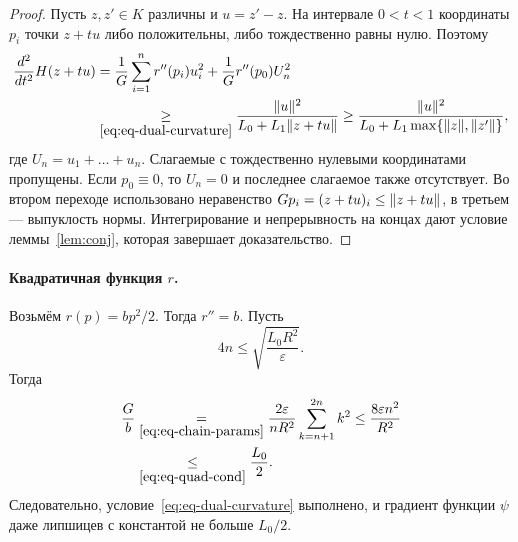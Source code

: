 \begin{proof}
Пусть $z,z'\in K$ различны и $u=z'-z$. На интервале $0<t<1$ координаты $p_i$ точки $z+tu$ либо положительны, либо тождественно равны нулю. Поэтому
\begin{align*}
 \frac{d^2}{dt^2}H(z+tu)
 &=\frac1G\sum_{i=1}^nr''(p_i)u_i^2+\frac1Gr''(p_0)U_n^2\\
 &\mathrel{\underset{\eqref{eq:eq-dual-curvature}}{\ge}}\frac{\|u\|^2}{L_0+L_1\|z+tu\|}
 \ge\frac{\|u\|^2}{L_0+L_1\max\{\|z\|,\|z'\|\}} ,
\end{align*}
где $U_n=u_1+\dots+u_n$. Слагаемые с тождественно нулевыми координатами пропущены. Если $p_0\equiv0$, то $U_n=0$ и последнее слагаемое также отсутствует. Во втором переходе использовано неравенство $Gp_i=(z+tu)_i\le\|z+tu\|$, в третьем --- выпуклость нормы. Интегрирование и непрерывность на концах дают условие леммы~\ref{lem:conj}, которая завершает доказательство.
\end{proof}

\paragraph{Квадратичная функция $r$.} Возьмём $r(p)=bp^2/2$. Тогда $r''=b$. Пусть
\begin{equation}\label{eq:eq-quad-cond}
 4n\le\sqrt{\frac{L_0R^2}\varepsilon} .
\end{equation}
Тогда
\begin{align*}
 \frac Gb
 &\mathrel{\underset{\eqref{eq:eq-chain-params}}{=}}\frac{2\varepsilon}{nR^2}\sum_{k=n+1}^{2n}k^2
 \le\frac{8\varepsilon n^2}{R^2}\\
 &\mathrel{\underset{\eqref{eq:eq-quad-cond}}{\le}}\frac{L_0}2 .
\end{align*}
Следовательно, условие~\eqref{eq:eq-dual-curvature} выполнено, и градиент функции $\psi$ даже липшицев с константой не больше $L_0/2$.

